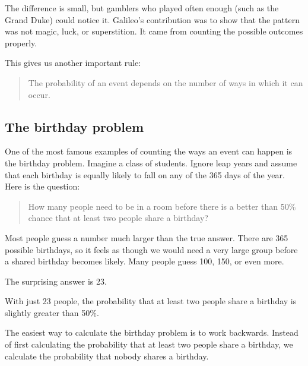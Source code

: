 \documentclass[
  letterpaper,
  DIV=11,
  numbers=noendperiod]{scrreprt}
\begin{document}
The difference is small, but gamblers who played often enough (such as
the Grand Duke) could notice it. Galileo's contribution was to show that
the pattern was not magic, luck, or superstition. It came from counting
the possible outcomes properly.

This gives us another important rule:

\begin{quote}
The probability of an event depends on the number of ways in which it
can occur.
\end{quote}

\subsection{The birthday problem}\label{the-birthday-problem}

One of the most famous examples of counting the ways an event can happen
is the birthday problem. Imagine a class of students. Ignore leap years
and assume that each birthday is equally likely to fall on any of the
365 days of the year. Here is the question:

\begin{quote}
How many people need to be in a room before there is a better than 50\%
chance that at least two people share a birthday?
\end{quote}

Most people guess a number much larger than the true answer. There are
365 possible birthdays, so it feels as though we would need a very large
group before a shared birthday becomes likely. Many people guess 100,
150, or even more.

\begin{tcolorbox}[enhanced jigsaw, arc=.35mm, bottomrule=.15mm, bottomtitle=1mm, breakable, colback=white, colbacktitle=quarto-callout-note-color!10!white, colframe=quarto-callout-note-color-frame, coltitle=black, left=2mm, leftrule=.75mm, opacityback=0, opacitybacktitle=0.6, rightrule=.15mm, title=\textcolor{quarto-callout-note-color}{\faInfo}\hspace{0.5em}{Click to see answer}, titlerule=0mm, toprule=.15mm, toptitle=1mm]

The surprising answer is 23.

With just 23 people, the probability that at least two people share a
birthday is slightly greater than 50\%.

\end{tcolorbox}

The easiest way to calculate the birthday problem is to work backwards.
Instead of first calculating the probability that at least two people
share a birthday, we calculate the probability that nobody shares a
birthday.
\end{document}
